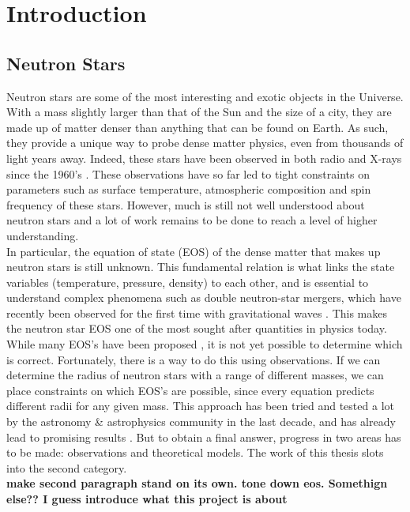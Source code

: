 \documentclass[../main.tex]{subfiles}
\begin{document}
\section{Introduction}

\subsection{Neutron Stars}
 Neutron stars are some of the most interesting and exotic objects in the Universe.  With a mass slightly larger than that of the Sun and the size of a city, they are made up of matter denser than anything that can be found on Earth.  As such, they provide a unique way to probe dense matter physics, even from thousands of light years away.  Indeed, these stars have been observed in both radio and X-rays since the 1960's \citep{Hewish1968,Shklovsky1967}.  These observations have so far led to tight constraints on parameters such as surface temperature, atmospheric composition and spin frequency of these stars. However, much is still not well understood about neutron stars and a lot of work remains to be done to reach a level of higher understanding. \\
 
 In particular, the equation of state (EOS) of the dense matter that makes up neutron stars is still unknown.  This fundamental relation is what links the state variables (temperature, pressure, density) to each other, and is essential to understand complex phenomena such as double neutron-star mergers, which have recently been observed for the first time with gravitational waves \citep{Abbott2017}.  This makes the neutron star EOS one of the most sought after quantities in physics today.  While many EOS's have been proposed \citep{Ozel2016a}, it is not yet possible to determine which is correct.  Fortunately, there is  a way to do this using observations.  If we can determine the radius of neutron stars with a range of different masses, we can place constraints on which EOS's are possible, since every equation predicts different radii for any given mass.  This approach has been tried and tested a lot by the astronomy \& astrophysics community in the last decade, and has already lead to promising results \citep{Ozel2016a}. But to obtain a final answer, progress in two areas has to be made: observations and theoretical models.  The work of this thesis slots into the second category.\\
 
 \textbf{make second paragraph stand on its own. tone down eos. Somethign else?? I guess introduce what this project is about}
 
\end{document}
